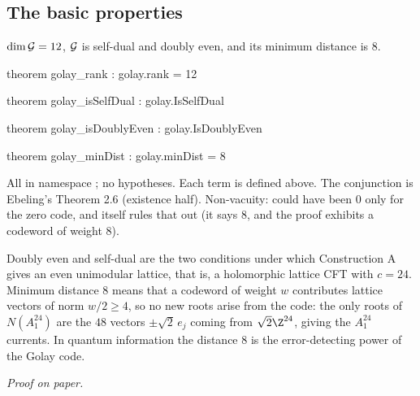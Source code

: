 \subsection{The basic properties}

\begin{theorem}\label{ch02:thm:golay}
$\dim\mathcal{G}=12$, $\mathcal{G}$ is self-dual and doubly even, and its minimum distance is $8$.
\end{theorem}
\begin{leancode}
theorem golay_rank : golay.rank = 12

theorem golay_isSelfDual : golay.IsSelfDual

theorem golay_isDoublyEven : golay.IsDoublyEven

theorem golay_minDist : golay.minDist = 8
\end{leancode}
\begin{dictionary}
All in namespace ; no hypotheses.  Each term is defined above.  The conjunction is
Ebeling's Theorem 2.6 (existence half).  Non-vacuity:  could have been $0$ only for
the zero code, and  itself rules that out (it says $8$, and the proof
exhibits a codeword of weight $8$).
\end{dictionary}
\begin{physics}
Doubly even and self-dual are the two conditions under which Construction A gives an even unimodular lattice, that is, a holomorphic lattice CFT with $c=24$. Minimum distance $8$ means that a codeword of weight $w$ contributes lattice vectors of norm $w/2\ge4$, so no new roots arise from the code: the only roots of $N(A_1^{24})$ are the $48$ vectors $\pm\sqrt2\,e_j$ coming from $\sqrt2\Z^{24}$, giving the $A_1^{24}$ currents. In quantum information the distance $8$ is the error-detecting power of the Golay code.
\end{physics}
\emph{Proof on paper.}
